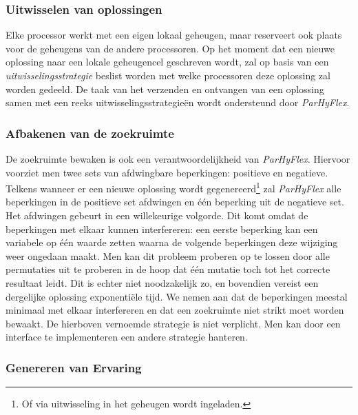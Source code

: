 \subsubsection{Uitwisselen van oplossingen}

Elke processor werkt met een eigen lokaal geheugen, maar reserveert ook plaats voor de geheugens van de andere processoren. Op het moment dat een nieuwe oplossing naar een lokale geheugencel geschreven wordt, zal op basis van een \emph{uitwisselingsstrategie} beslist worden met welke processoren deze oplossing zal worden gedeeld. De taak van het verzenden en ontvangen van een oplossing samen met een reeks uitwisselingsstrategie\"en wordt ondersteund door \emph{ParHyFlex}.

\subsubsection{Afbakenen van de zoekruimte}
 
De zoekruimte bewaken is ook een verantwoordelijkheid van \emph{ParHyFlex}. Hiervoor voorziet men twee sets van afdwingbare beperkingen: positieve en negatieve. Telkens wanneer er een nieuwe oplossing wordt gegenereerd\footnote{Of via uitwisseling in het geheugen wordt ingeladen.} zal \emph{ParHyFlex} alle beperkingen in de positieve set afdwingen en \'e\'en beperking uit de negatieve set. Het afdwingen gebeurt in een willekeurige volgorde. Dit komt omdat de beperkingen met elkaar kunnen interfereren: een eerste beperking kan een variabele op \'e\'en waarde zetten waarna de volgende beperkingen deze wijziging weer ongedaan maakt. Men kan dit probleem proberen op te lossen door alle permutaties uit te proberen in de hoop dat \'e\'en mutatie toch tot het correcte resultaat leidt. Dit is echter niet noodzakelijk zo, en bovendien vereist een dergelijke oplossing exponenti\"ele tijd. We nemen aan dat de beperkingen meestal minimaal met elkaar interfereren en dat een zoekruimte niet strikt moet worden bewaakt. De hierboven vernoemde strategie is niet verplicht. Men kan door een interface te implementeren een andere strategie hanteren.

\subsubsection{Genereren van Ervaring}
 
